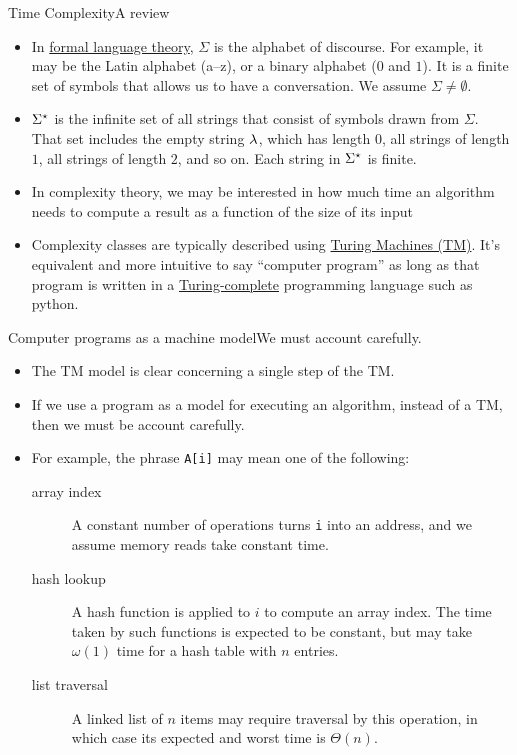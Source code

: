 \begin{frame}{Time Complexity}{A review}
\begin{itemize}[<+->]
    \item In \href{https://en.wikipedia.org/wiki/Formal_language}{formal language theory}, $\Sigma$ is the alphabet of discourse. For example, it may be the Latin alphabet (a--z), or a binary alphabet ($0$ and $1$).  It is a finite set of symbols that allows us to have a conversation.  We assume $\Sigma\not=\emptyset$.
    \item $\Sigma^{\star}$ is the infinite set of all strings that consist of symbols drawn from $\Sigma$.  That set includes the empty string $\lambda$, which has length $0$, all strings of length $1$, all strings of length $2$, and so on.  Each string in $\Sigma^{\star}$ is finite.
    \item In complexity theory, we may be interested in how much time an algorithm needs to compute a result as a function of the size of its input
    \item Complexity classes are typically described using \href{https://en.wikipedia.org/wiki/Turing_machine}{Turing Machines (TM)}.  It's equivalent and more intuitive to say ``computer program'' as long as that program is written in a \href{https://en.wikipedia.org/wiki/Turing_completeness}{Turing-complete} programming language such as python.
    \end{itemize}
\end{frame}

\begin{frame}{Computer programs as a machine model}{We must account carefully.}

\begin{itemize}[<+->]
   \item The TM model is clear concerning a single step of the TM.
   \item If we use a program as a model for executing an algorithm, instead of a TM, then we must be account carefully.
   \item For example, the phrase \texttt{A[i]} may mean one of the following:
   \begin{description}
        \item[array index]  A constant number of operations turns \texttt{i} into an address, and we assume memory reads take constant time.
        \item[hash lookup]  A hash function is applied to $i$ to compute an array index. The time taken by such functions is expected to be constant, but may take $\omega(1)$ time for a hash table with $n$ entries.
        \item[list traversal]  A linked list of $n$ items may require traversal by this operation, in which case its expected and worst time is $\Theta(n)$.
   \end{description}
\end{itemize}

\end{frame}


